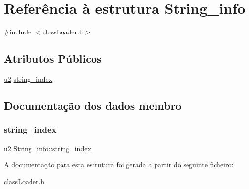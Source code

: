 \hypertarget{struct_string__info}{}\section{Referência à estrutura String\+\_\+info}
\label{struct_string__info}


{\ttfamily \#include $<$class\+Loader.\+h$>$}

\subsection*{Atributos Públicos}
\begin{DoxyCompactItemize}
\item 
\hyperlink{util_8h_a55ef8d87fd202b8417704c089899c5b9}{u2} \hyperlink{struct_string__info_a8a3bdfbfe27510d817ff10ea35e98ab3}{string\+\_\+index}
\end{DoxyCompactItemize}


\subsection{Documentação dos dados membro}
\mbox{\label{struct_string__info_a8a3bdfbfe27510d817ff10ea35e98ab3}} 
\subsubsection{\texorpdfstring{string\+\_\+index}{string\_index}}
{\footnotesize\ttfamily \hyperlink{util_8h_a55ef8d87fd202b8417704c089899c5b9}{u2} String\+\_\+info\+::string\+\_\+index}



A documentação para esta estrutura foi gerada a partir do seguinte ficheiro\+:\begin{DoxyCompactItemize}
\item 
\hyperlink{class_loader_8h}{class\+Loader.\+h}\end{DoxyCompactItemize}
